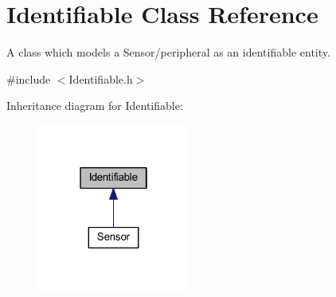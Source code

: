 \hypertarget{class_identifiable}{}\section{Identifiable Class Reference}
\label{class_identifiable}


A class which models a Sensor/peripheral as an identifiable entity.  




{\ttfamily \#include $<$Identifiable.\+h$>$}



Inheritance diagram for Identifiable\+:
\nopagebreak
\begin{figure}[H]
\begin{center}
\leavevmode
\includegraphics[width=142pt]{class_identifiable__inherit__graph}
\end{center}
\end{figure}
